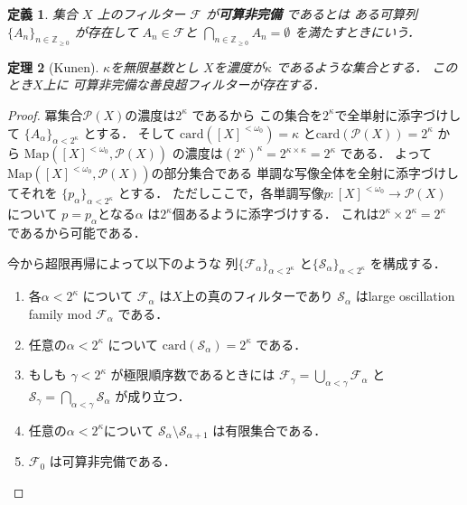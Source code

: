 \documentclass[leqno, a4paper, 12pt]{jsarticle}
\newtheorem{thm}{定理}
\newtheorem{df}[thm]{定義}
\newcommand{\zz}{\mathbb{Z}}
\newcommand{\card}{\mathrm{card}}
\newcommand{\myfinset}[1]{[#1]^{<\omega_{0}}}
\newcommand{\myfil}[1]{\mathcal{#1}}
\newcommand{\myfam}[1]{\mathscr{#1}}
\newcommand{\mymap}[2]{\mathrm{Map}(#1, #2)}
\newcommand{\mypowset}[1]{\mathcal{P}(#1)}
\begin{document}
\begin{df}
集合
$X$
上のフィルター
$\myfil{F}$
が\textbf{可算非完備}
であるとは
ある可算列$\{A_{n}\}_{n\in \zz_{\ge 0}}$
が存在して
$A_{n}\in \myfil{F}$と
$\bigcap_{n\in \zz_{\ge 0}}A_{n}=\emptyset$
を満たすときにいう．
\end{df}
\begin{thm}[Kunen]
$\kappa$を無限基数とし
$X$を濃度が$\kappa$
であるような集合とする．
このとき$X$上に
可算非完備な善良超フィルターが存在する．
\end{thm}
\begin{proof}
冪集合$\mypowset{X}$の濃度は$2^{\kappa}$
であるから
この集合を$2^{\kappa}$で全単射に添字づけして
$\{A_{\alpha}\}_{\alpha<2^{\kappa}}$
とする．
そして
$\card(\myfinset{X})=\kappa$
と$\card(\mypowset{X})=2^{\kappa}$
から
$\mymap{\myfinset{X}}{\mypowset{X}}$
の濃度は$(2^{\kappa})^{\kappa}=2^{\kappa\times \kappa}=2^{\kappa}$
である．
よって
$\mymap{\myfinset{X}}{\mypowset{X}}$の部分集合である
単調な写像全体を全射に添字づけしてそれを
$\{p_{\alpha}\}_{\alpha<2^{\kappa}}$
とする．
ただしここで，各単調写像$p\colon \myfinset{X}\to \mypowset{X}$
について
$p=p_{\alpha}$となる$\alpha$
は$2^{\kappa}$個あるように添字づけする．
これは$2^{\kappa}\times 2^{\kappa}=2^{\kappa}$
であるから可能である．

今から超限再帰によって以下のような
列$\{\myfil{F}_{\alpha}\}_{\alpha<2^{\kappa}}$
と$\{\myfam{S}_{\alpha}\}_{\alpha<2^{\kappa}}$
を構成する．
\begin{enumerate}[label=\textup{(K\arabic*)}]
\item\label{item:11}
各$\alpha<2^{\kappa}$
について
$\myfil{F}_{\alpha}$
は$X$上の真のフィルターであり
$\myfam{S}_{\alpha}$
はlarge oscillation family mod 
$\myfil{F}_{\alpha}$
である．

\item\label{item:22}
任意の$\alpha<2^{\kappa}$
について
$\card(\myfam{S}_{\alpha})=2^{\kappa}$
である．

\item\label{item:33}
もしも
$\gamma<2^{\kappa}$
が極限順序数であるときには
$\myfil{F}_{\gamma}=\bigcup_{\alpha<\gamma}\myfil{F}_{\alpha}$
と
$\myfam{S}_{\gamma}=\bigcap_{\alpha<\gamma}\myfam{S}_{\alpha}$
が成り立つ．

\item\label{item:44}
任意の$\alpha<2^{\kappa}$について
$\myfam{S}_{\alpha}\setminus \myfam{S}_{\alpha+1}$
は有限集合である．

\item\label{item:55}
$\myfil{F}_{0}$
は可算非完備である．


\end{enumerate}
\end{proof}
\end{document}
